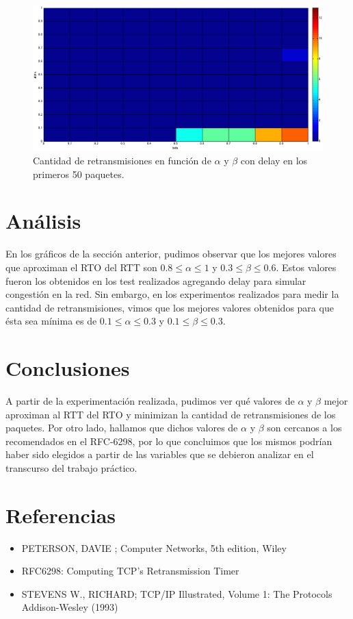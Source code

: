 \documentclass[10pt, a4paper]{article}
\begin{document}
\begin{figure}[H]
\begin{center}
\includegraphics[width=17cm]{delay-50L-ret-costado.png}
\caption{Cantidad de retransmisiones en función de $\alpha$ y $\beta$ con delay en los primeros 50 paquetes.}
\end{center}
\end{figure}


\newpage
\section{Análisis}
En los gráficos de la sección anterior, pudimos observar que los mejores valores que aproximan el RTO del RTT son $ 0.8 \leq \alpha \leq 1$ y $ 0.3 \leq  \beta \leq 0.6$. Estos valores fueron los obtenidos en los test realizados agregando delay para simular congestión en la red.
Sin embargo, en los experimentos realizados para medir la cantidad de retransmisiones, vimos que los mejores valores obtenidos para que ésta sea mínima es de $ 0.1 \leq \alpha \leq 0.3$ y $ 0.1 \leq  \beta \leq 0.3$.

\newpage
\section{Conclusiones}
A partir de la experimentación realizada, pudimos ver qué valores de $\alpha$ y $\beta$ mejor aproximan al RTT del RTO y minimizan la cantidad de retransmisiones de los paquetes.
Por otro lado, hallamos que dichos valores de $\alpha$ y $\beta$ son cercanos a los recomendados en el RFC-6298, por lo que concluimos que los mismos podrían haber sido elegidos a partir de las variables que se debieron analizar en el transcurso del trabajo práctico.

\section{Referencias}
\begin{itemize}
\item PETERSON, DAVIE ; Computer Networks, 5th edition, Wiley

\item{RFC6298: Computing TCP's Retransmission Timer}

\item{STEVENS W., RICHARD; TCP/IP Illustrated, Volume 1: The Protocols Addison-Wesley (1993)}

\end{itemize}
\end{document}
